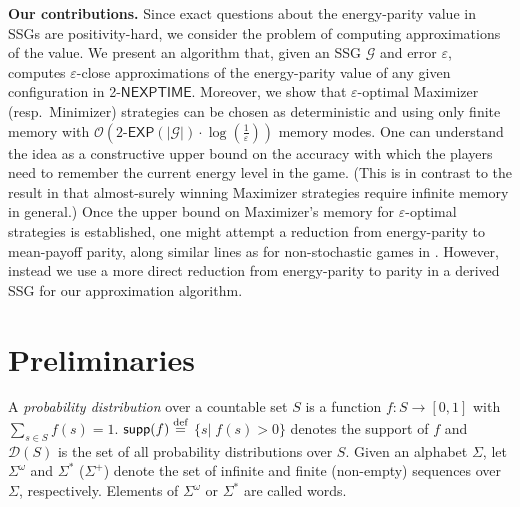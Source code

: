\documentclass[a4paper,UKenglish,cleveref,autoref,thm-restate]{lipics-v2021}
\newcommand{\+}[1]{\mathbb{#1}}
\newcommand{\?}[1]{\mathcal{#1}}
\newcommand{\Ocompl}{\?{O}}
\newcommand{\abs}[1]{\lvert#1\rvert}
\newcommand{\size}[1]{\abs{#1}}
\newcommand{\eqby}[2][=]{\stackrel{\text{{\tiny{#2}}}}{#1}}
\newcommand{\eqdef}{\eqby{def}}
\newcommand{\eps}{\varepsilon}
\newcommand{\NEXPTIME}{\ensuremath{\mathsf{NEXPTIME}}}
\newcommand{\dist}{\mathcal{D}}
\newcommand{\supp}{{\sf supp}}
\newcommand{\lrc}[1]{\left(#1\right)}
\newcommand{\lrd}[1]{\{#1\}}
\newcommand{\setcomp}[2]{\lrd{{#1}|\;{#2}}}
\newcommand{\game}{{\mathcal G}}
\newcommand{\om}{\omega}
\begin{document}
{\bf Our contributions.}
Since exact questions about the energy-parity value in SSGs are
positivity-hard,
we consider the problem of computing approximations of the value.
We present an algorithm that, given an SSG $\game$ and error $\eps$,
computes $\eps$-close approximations
of the energy-parity value of any given configuration in 2-\NEXPTIME.
Moreover, we show that $\eps$-optimal Maximizer (resp.\ Minimizer)
strategies can be chosen as deterministic and using only finite memory
with ${\Ocompl}\lrc{2\textrm{-}\mathsf{EXP}\lrc{\size{\game}} \cdot\log\lrc{\frac{1}{\eps}}}$
memory modes.
One can understand the idea as a constructive upper bound on the accuracy
with which the players need to remember the current energy level in
the game.
(This is in contrast to the result in \cite{MSTW2017} that
almost-surely winning Maximizer strategies require infinite
memory in general.)
Once the upper bound on Maximizer's memory for $\eps$-optimal strategies
is established, one might attempt a reduction from energy-parity to
mean-payoff parity, along similar lines as for non-stochastic games in
\cite{CD2010}. However, instead we use a more direct reduction
from energy-parity to parity in a derived SSG for our approximation algorithm.


\section{Preliminaries}\label{sec:prelim}

A \textit{probability distribution} over a countable set $S$ is a function
\mbox{$f: S \to [0,1]$} with \mbox{$\sum_{s \in S} f(s) = 1$}.
$\supp(f) \eqdef$ \mbox{$\setcomp{s}{f(s)>0}$} denotes the support of
$f$ and $\dist(S)$ is the set of all probability distributions over $S$.
Given an alphabet $\Sigma$,
let $\Sigma^{\om}$ and $\Sigma^{*}$ ($\Sigma^+$) denote the set of infinite
and finite (non-empty) sequences over $\Sigma$, respectively.
Elements of $\Sigma^{\om}$ or $\Sigma^*$ are called words.
\end{document}
